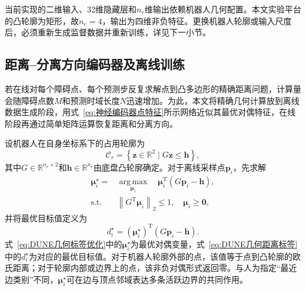 当前实现的二维输入、32维隐藏层和$n_e$维输出依赖机器人几何配置。本文实验平台的凸轮廓为矩形，故$n_e=4$，输出为四维非负特征。更换机器人轮廓或输入尺度后，必须重新生成监督数据并重新训练，详见下一小节。

\subsection{距离--分离方向编码器及离线训练}
若在线对每个障碍点、每个预测步反复求解点到凸多边形的精确距离问题，计算量会随障碍点数$M$和预测时域长度$N$迅速增加。为此，本文将精确几何计算放到离线数据生成阶段，用式~\eqref{eq:神经编码器点特征}所示网络近似其最优对偶特征，在线阶段再通过简单矩阵运算恢复距离和分离方向。

设机器人在自身坐标系下的占用轮廓为
\begin{equation}
	\mathcal{C}_{r}
	=
	\left\{
	\mathbf{z}\in\mathbb{R}^{2}
	\mid
	G\mathbf{z}\leq\mathbf{h}
	\right\},
	\label{eq:机器人凸轮廓}
\end{equation}
其中$G\in\mathbb{R}^{n_e\times2}$和$\mathbf h\in\mathbb{R}^{n_e}$由底盘凸轮廓确定。对于离线采样点$\mathbf p_i$，先求解
\begin{align}
    \boldsymbol{\mu}_i^{\star}
    ={}&\underset{\boldsymbol{\mu}_i}{\operatorname{arg\,max}}
    \quad \boldsymbol{\mu}_i^{\mathrm T}(G\mathbf p_i-\mathbf h),
    \label{eq:DUNE几何标签优化}\\
    \mathrm{s.t.}\quad
    &\left\|G^{\mathrm T}\boldsymbol{\mu}_i\right\|_2\leq1,
    \quad \boldsymbol{\mu}_i\geq\mathbf0,
    \nonumber
\end{align}
并将最优目标值定义为
\begin{equation}
    d_i^{\star}
    =(\boldsymbol{\mu}_i^{\star})^{\mathrm T}(G\mathbf p_i-\mathbf h).
    \label{eq:DUNE几何距离标签}
\end{equation}
式~\eqref{eq:DUNE几何标签优化}中的$\boldsymbol\mu_i^{\star}$为最优对偶变量，式~\eqref{eq:DUNE几何距离标签}中的$d_i^{\star}$为对应的最优目标值。对于机器人轮廓外部的点，该值等于点到凸轮廓的欧氏距离；对于轮廓内部或边界上的点，该非负对偶形式返回零。与人为指定“最近边类别”不同，$\boldsymbol\mu_i^{\star}$可在边与顶点邻域表达多条活跃边界的共同作用。

